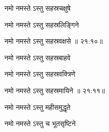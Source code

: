 \ujvers{}    %
  

\nemslokab

{\devanagarifont नमो नमस्ते ऽस्तु सहस्रचक्षुषे  \danda\dontdisplaylinenum }%
 
\nemslokac

{\devanagarifont नमो नमस्ते ऽस्तु सहस्रलिङ्गिने }%
  \dontdisplaylinenum


\nemslokad

{\devanagarifont नमो नमस्ते ऽस्तु सहस्रवक्षसे {॥ २१:१०॥} \veg\dontdisplaylinenum }%
 
\ujvers{}    %
  

\nemslokab

{\devanagarifont नमो नमस्ते ऽस्तु सहस्रबाहवे  \danda\dontdisplaylinenum }%
 
\nemslokac

{\devanagarifont नमो नमस्ते ऽस्तु सहस्रवक्त्रिणे }%
  \dontdisplaylinenum    {}%



\nemslokad

{\devanagarifont नमो नमस्ते ऽस्तु सहस्रमायिने {॥ २१:११॥} \veg\dontdisplaylinenum }%
 
\ujvers{}    %


\nemslokab

{\devanagarifont नमो नमस्ते ऽस्तु महीसमुद्धृते  \danda\dontdisplaylinenum }%
 
\nemslokac

{\devanagarifont नमो नमस्ते ऽस्तु च भूतसृष्टिने }%
  \dontdisplaylinenum    {}%



